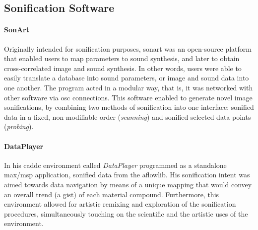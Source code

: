 \subsection{Sonification Software}
\label{sonification:software}

\paragraph{SonArt}
Originally intended for sonification purposes, \gls{sonart} \parencite{icad/2002/ben-tal} was an open-source platform that enabled users to map parameters to sound synthesis, and later \parencite{icmc/bbp2372.2004.128} to obtain cross-correlated image and sound synthesis. In other words, users were able to easily translate a database into sound parameters, or image and sound data into one another. The program acted in a modular way, that is, it was networked with other software via \gls{osc} connections. This software enabled \textcite{DBLP:conf/icmc/YeoB05} to generate novel image sonifications, by combining two methods of sonification into one interface: sonified data in a fixed, non-modifiable order (\textit{scanning}) and sonified selected data points (\textit{probing}).

\paragraph{DataPlayer}
In his \gls{caddc} environment called \textit{DataPlayer} programmed as a standalone \gls{max/msp} application, \textcite{icmc/bbp2372.2015.072} sonified data from the \gls{aflowlib}. His sonification intent was aimed towards data navigation by means of a unique mapping that would convey an overall trend (a gist) of each material compound. Furthermore, this environment allowed for artistic remixing and exploration of the sonification procedures, simultaneously touching on the scientific and the artistic uses of the environment.

